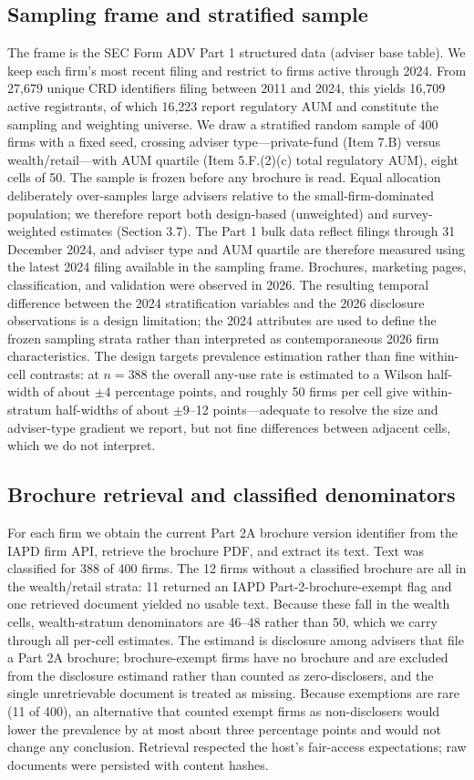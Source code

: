\documentclass[utf8]{FrontiersinHarvard}
\begin{document}
\subsection{Sampling frame and stratified sample}
The frame is the SEC Form ADV Part 1 structured data (adviser base table). We keep each firm's most recent filing and restrict to firms active through 2024. From 27{,}679 unique CRD identifiers filing between 2011 and 2024, this yields 16{,}709 active registrants, of which 16{,}223 report regulatory AUM and constitute the sampling and weighting universe. We draw a stratified random sample of 400 firms with a fixed seed, crossing adviser type---private-fund (Item 7.B) versus wealth/retail---with AUM quartile (Item 5.F.(2)(c) total regulatory AUM), eight cells of 50. The sample is frozen before any brochure is read. Equal allocation deliberately over-samples large advisers relative to the small-firm-dominated population; we therefore report both design-based (unweighted) and survey-weighted estimates (Section 3.7). The Part 1 bulk data reflect filings through 31 December 2024, and adviser type and AUM quartile are therefore measured using the latest 2024 filing available in the sampling frame. Brochures, marketing pages, classification, and validation were observed in 2026. The resulting temporal difference between the 2024 stratification variables and the 2026 disclosure observations is a design limitation; the 2024 attributes are used to define the frozen sampling strata rather than interpreted as contemporaneous 2026 firm characteristics. The design targets prevalence estimation rather than fine within-cell contrasts: at $n = 388$ the overall any-use rate is estimated to a Wilson half-width of about $\pm 4$ percentage points, and roughly 50 firms per cell give within-stratum half-widths of about $\pm 9$--12 points---adequate to resolve the size and adviser-type gradient we report, but not fine differences between adjacent cells, which we do not interpret.

\subsection{Brochure retrieval and classified denominators}
For each firm we obtain the current Part 2A brochure version identifier from the IAPD firm API, retrieve the brochure PDF, and extract its text. Text was classified for 388 of 400 firms. The 12 firms without a classified brochure are all in the wealth/retail strata: 11 returned an IAPD Part-2-brochure-exempt flag and one retrieved document yielded no usable text. Because these fall in the wealth cells, wealth-stratum denominators are 46--48 rather than 50, which we carry through all per-cell estimates. The estimand is disclosure among advisers that file a Part 2A brochure; brochure-exempt firms have no brochure and are excluded from the disclosure estimand rather than counted as zero-disclosers, and the single unretrievable document is treated as missing. Because exemptions are rare (11 of 400), an alternative that counted exempt firms as non-disclosers would lower the prevalence by at most about three percentage points and would not change any conclusion. Retrieval respected the host's fair-access expectations; raw documents were persisted with content hashes.
\end{document}
